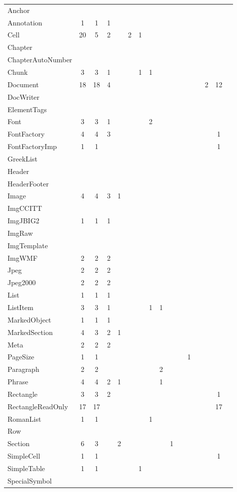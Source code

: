 \begin{table}[h!]
\begin{center}
\begin{tabular}{l c c c c c c c c c c c c c c c}
\hline
Anchor &&&&&&&&&&&&&&\\
Annotation &1&1&1&&&&&&&&&&&\\
Cell &20&5&2&&2&1&&&&&&&&\\
Chapter &&&&&&&&&&&&&&\\
ChapterAutoNumber &&&&&&&&&&&&&&\\
Chunk &3&3&1&&&1&1&&&&&&&\\
Document &18&18&4&&&&&&&&&&2&12\\
DocWriter &&&&&&&&&&&&&&\\
ElementTags &&&&&&&&&&&&&&\\
Font &3&3&1&&&&2&&&&&&&\\
FontFactory &4&4&3&&&&&&&&&&&1\\
FontFactoryImp &1&1&&&&&&&&&&&&1\\
GreekList &&&&&&&&&&&&&&\\
Header &&&&&&&&&&&&&&\\
HeaderFooter &&&&&&&&&&&&&&\\
Image &4&4&3&1&&&&&&&\\
ImgCCITT &&&&&&&&&&&\\
ImgJBIG2 &1&1&1&&&&&&&&\\
ImgRaw &&&&&&&&&&&\\
ImgTemplate &&&&&&&&&&&\\
ImgWMF &2&2&2&&&&&&&&\\
Jpeg &2&2&2&&&&&&&&\\
Jpeg2000 &2&2&2&&&&&&&&\\
List &1&1&1&&&&&&&&\\
ListItem &3&3&1&&&&1&1&&&\\
MarkedObject &1&1&1&&&&&&&&\\
MarkedSection &4&3&2&1&&&&&&&\\
Meta &2&2&2&&&&&&&&\\
PageSize &1&1&&&&&&&&&1\\
Paragraph &2&2&&&&&&2&&&\\
Phrase &4&4&2&1&&&&1&&&\\
Rectangle &3&3&2&&&&&&&&&&&1\\
RectangleReadOnly &17&17&&&&&&&&&&&&17\\
RomanList &1&1&&&&&1&&&&&&&\\
Row &&&&&&&&&&&&&&\\
Section &6&3&&2&&&&&1&&&&&\\
SimpleCell &1&1&&&&&&&&&&&&1\\
SimpleTable &1&1&&&&1&&&&&&&&\\
SpecialSymbol &&&&&&&&&&&&&&\\

\end{tabular}
\end{center}
\end{table}
